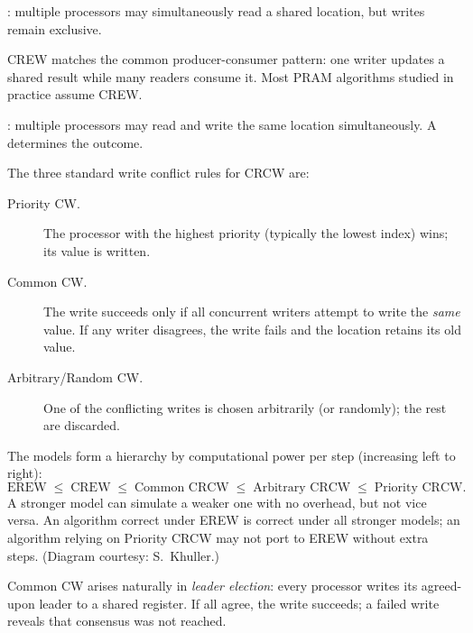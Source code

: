 \begin{ppdefn}
: multiple processors may
simultaneously read a shared location, but writes remain exclusive.
\end{ppdefn}

CREW matches the common producer-consumer pattern: one writer updates a
shared result while many readers consume it. Most PRAM algorithms studied in
practice assume CREW.

\begin{ppdefn}
: multiple processors may
read and write the same location simultaneously. A  determines the outcome.
\end{ppdefn}

The three standard write conflict rules for CRCW are:

\begin{description}
  \item[Priority CW.] The processor with the highest priority (typically the
    lowest index) wins; its value is written.
  \item[Common CW.] The write succeeds only if all concurrent writers attempt
    to write the \emph{same} value. If any writer disagrees, the write fails
    and the location retains its old value.
  \item[Arbitrary/Random CW.] One of the conflicting writes is chosen
    arbitrarily (or randomly); the rest are discarded.
\end{description}

\begin{ppnote}
The models form a hierarchy by computational power per step (increasing left
to right):
\[
  \text{EREW} \;\leq\; \text{CREW} \;\leq\; \text{Common CRCW}
  \;\leq\; \text{Arbitrary CRCW} \;\leq\; \text{Priority CRCW}.
\]
A stronger model can simulate a weaker one with no overhead, but not vice
versa. An algorithm correct under EREW is correct under all stronger models;
an algorithm relying on Priority CRCW may not port to EREW without extra
steps. (Diagram courtesy: S.~Khuller.)
\end{ppnote}

\begin{ppexample}
Common CW arises naturally in \emph{leader election}: every processor writes
its agreed-upon leader to a shared register. If all agree, the write succeeds;
a failed write reveals that consensus was not reached.
\end{ppexample}

